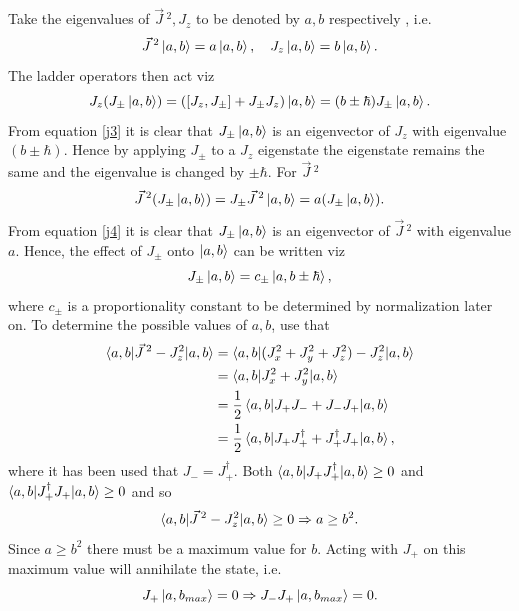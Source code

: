 Take the eigenvalues of $\vec{J}\,^2, J_z$ to be denoted by $a,b$ respectively , i.e.
\begin{equation}
	\vec{J}\,^2\ket{a,b}=a\ket{a,b}, \quad J_z\ket{a,b}=b\ket{a,b}.
\end{equation} 
The ladder operators then act viz
\begin{equation}
	J_z(J_\pm\ket{a,b})=([J_z,J_\pm]+J_\pm J_z)\ket{a,b}=(b\pm \hbar)J_\pm\ket{a,b}.
	\label{j3}
\end{equation} 
From equation \eqref{j3} it is clear that $J_\pm\ket{a,b}$ is an eigenvector of $J_z$ with eigenvalue $(b\pm \hbar)$. Hence by applying $J_\pm$ to a $J_z$ eigenstate the eigenstate remains the same and the eigenvalue is changed by $\pm \hbar$. For $\vec{J}\,^2$
\begin{equation}
	\vec{J}\,^2(J_\pm\ket{a,b})=J_\pm\vec{J}\,^2\ket{a,b}=a(J_\pm\ket{a,b}).
	\label{j4}
\end{equation}  
From equation \eqref{j4} it is clear that $J_\pm\ket{a,b}$ is an eigenvector of $\vec{J}\,^2$ with eigenvalue $a$. Hence, the effect of $J_\pm$ onto $\ket{a,b}$ can be written viz
\begin{equation}
	J_\pm\ket{a,b}=c_\pm\ket{a,b\pm\hbar},
\end{equation} 
where $c_\pm$ is a proportionality constant to be determined by normalization later on. To determine the possible values of $a,b$, use that
\begin{equation}
	\begin{split}
		\braket{a,b|\vec{J}\,^2-J_z^2|a,b}&=\braket{a,b|(J_x^2+J_y^2+J_z^2)-J_z^2|a,b}\\
		&=\braket{a,b|J_x^2+J_y^2|a,b}\\
		&=\frac{1}{2}\braket{a,b|J_+J_-+J_-J_+|a,b}\\
		&=\frac{1}{2}\braket{a,b|J_+J_+^\dagger+J_+^\dagger J_+|a,b},\\
	\end{split}
\end{equation} 
where it has been used that $J_-=J_+^\dagger$. Both $\braket{a,b|J_+J_+^\dagger|a,b}\geq 0$ and \newline $\braket{a,b|J_+^\dagger J_+|a,b}\geq 0$ and so
\begin{equation}
	\braket{a,b|\vec{J}\,^2-J_z^2|a,b}\geq 0 \Rightarrow a\geq b^2.
\end{equation} 
Since $a\geq b^2$ there must be a maximum value for $b$. Acting with $J_+$ on this maximum value will annihilate the state, i.e.
\begin{equation}
	J_+\ket{a,b_{max}}=0\Rightarrow J_-J_+\ket{a,b_{max}}=0.
	\label{j5}
\end{equation} 
